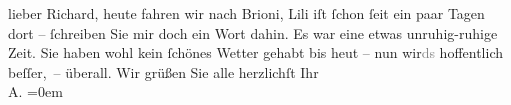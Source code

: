 \begin{ledgroupsized}[t]{13cm}
           \pstart{}lieber Richard,\pend\pstart
           heute fahren wir nach Brioni, Lili iſt ſchon ſeit ein paar Tagen dort – ſchreiben Sie mir
               doch ein Wort dahin. Es war eine etwas unruhig-ruhige Zeit. Sie haben wohl kein
               ſchönes Wetter gehabt bis heut – {\pb}nun
                  wir\textcolor{gray}{ds} hoffentlich beſſer, – überall. Wir grüßen Sie alle
               herzlichſt\pend
           \pstart
           Ihr{\\[\baselineskip]}\spacefill\mbox{A.}\pend
           \leftskip=0em{}\endnumbering{}\end{ledgroupsized}  \newcommand{\dateiname}{L02145}\newcommand{\titel}{Arthur Schnitzler an Richard Beer-Hofmann, 23. 7. 1913}\newcommand{\editorInnen}{Martin Anton Müller und Gerd-Hermann Susen}
      